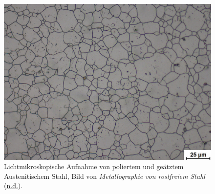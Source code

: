 \documentclass[
  12pt,
  openany]{book}
\begin{document}
\begin{figure}

{\centering \includegraphics[width=.8\textwidth]{../imgs/fig5} 

}

\caption[Lichtmikroskopische Aufnahme von Austenitischem Stahl.]{Lichtmikroskopische Aufnahme von poliertem und geätztem Austenitischem Stahl, Bild von \emph{Metallographie von rostfreiem Stahl} (\protect\hyperlink{ref-MetallographieRostfreiemStahl}{n.d.}).}\label{fig:baseGrain}
\end{figure}
\end{document}
